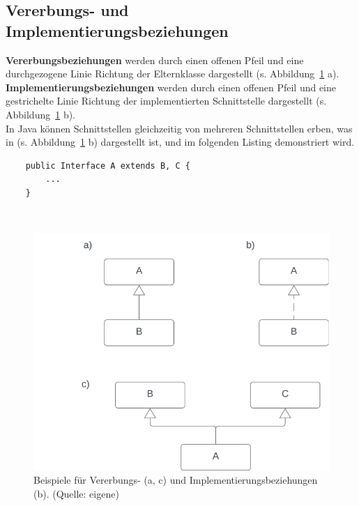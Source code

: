 \subsection{Vererbungs- und Implementierungsbeziehungen}

\textbf{Vererbungsbeziehungen} werden durch einen offenen Pfeil und eine durchgezogene Linie Richtung der Elternklasse dargestellt (s. Abbildung~\ref{fig:inheritance} a).\\

\textbf{Implementierungsbeziehungen} werden durch einen offenen Pfeil und eine gestrichelte Linie Richtung der implementierten Schnittstelle dargestellt (s. Abbildung~\ref{fig:inheritance} b).\\

In Java können Schnittstellen gleichzeitig von mehreren Schnittstellen erben, was in (s. Abbildung~\ref{fig:inheritance} b) dargestellt ist, und im folgenden Listing demonstriert wird.\\

\begin{verbatim}
    public Interface A extends B, C {
        ...
    }
\end{verbatim}\\

\begin{figure}
    \centering
    \includegraphics[scale=0.5]{chapters/fopt3/img/inheritance}
    \caption{Beispiele für Vererbungs- (a, c) und Implementierungsbeziehungen (b). (Quelle: eigene)}
    \label{fig:inheritance}
\end{figure}

